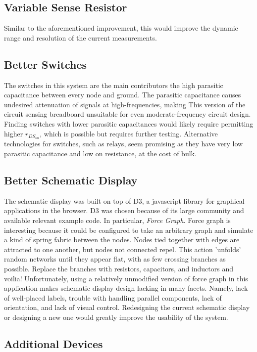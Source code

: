\documentclass[11pt,twoside]{mitthesis}
\begin{document}
\subsection{Variable Sense Resistor}

Similar to the aforementioned improvement, this would improve the dynamic range and resolution of the current measurements.  

\subsection{Better Switches}
The switches in this system are the main contributors the high parasitic capacitance between every node and ground.
The parasitic capacitance causes undesired attenuation of signals at high-frequencies, making This version of the circuit sensing breadboard unsuitable for even moderate-frequency circuit design.
Finding switches with lower parasitic capacitances would likely require permitting higher $r_{DS_{on}}$, which is possible but requires further testing.
Alternative technologies for switches, such as relays, seem promising as they have very low parasitic capacitance and low on resistance, at the cost of bulk.

\subsection{Better Schematic Display}

The schematic display was built on top of D3, a javascript library for graphical applications in the browser.
D3 was chosen because of its large community and available relevant example code.
In particular, \emph{Force Graph}.
Force graph is interesting because it could be configured to take an arbitrary graph and simulate a kind of spring fabric between the nodes.
Nodes tied together with edges are attracted to one another, but nodes not connected repel.
This action 'unfolds' random networks until they appear flat, with as few crossing branches as possible.
Replace the branches with resistors, capacitors, and inductors and voilia!
Unfortunately, using a relatively unmodified version of force graph in this application makes schematic display design lacking in many facets.
Namely, lack of well-placed labels, trouble with handling parallel components, lack of orientation, and lack of visual control.
Redesigning the current schematic display or designing a new one would greatly improve the usability of the system.

\subsection{Additional Devices}
\end{document}
